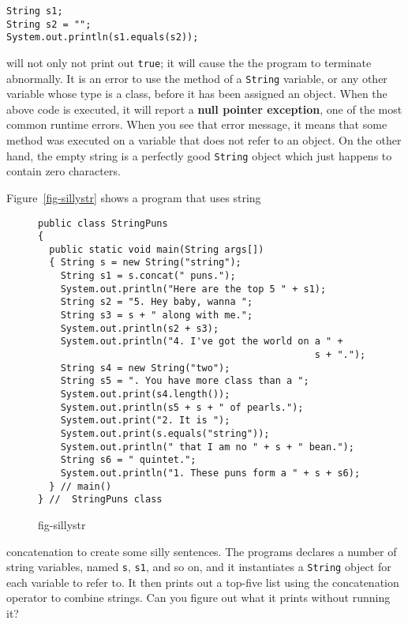 \begin{jjjlisting}
\begin{lstlisting}
String s1;
String s2 = "";
System.out.println(s1.equals(s2));
\end{lstlisting}
\end{jjjlisting}

\noindent will not only not print out {\tt true}; it will cause the
the program to terminate abnormally.  It is an error to use the
method of a {\tt String} variable, or any other variable whose type is a class,
before it has been assigned an object.  
When the above code is executed, it will report a 
{\bf null pointer exception}, one of the most common runtime errors.
When you see that error message, it means that some  method was executed 
on a variable that does not refer to an object.  On the other hand, the
empty string is a perfectly good {\tt String} object which just happens 
to contain zero characters.

Figure~\ref{fig-sillystr} shows a program that uses string
\begin{figure}[h!]
\jjjprogstart
\begin{jjjlisting}
\begin{lstlisting}
public class StringPuns 
{
  public static void main(String args[]) 
  { String s = new String("string");
    String s1 = s.concat(" puns.");
    System.out.println("Here are the top 5 " + s1);
    String s2 = "5. Hey baby, wanna ";
    String s3 = s + " along with me.";
    System.out.println(s2 + s3);
    System.out.println("4. I've got the world on a " + 
                                                 s + ".");
    String s4 = new String("two");
    String s5 = ". You have more class than a ";
    System.out.print(s4.length());
    System.out.println(s5 + s + " of pearls.");
    System.out.print("2. It is ");
    System.out.print(s.equals("string"));
    System.out.println(" that I am no " + s + " bean.");
    String s6 = " quintet.";
    System.out.println("1. These puns form a " + s + s6);        
  } // main()
} //  StringPuns class
\end{lstlisting}
\end{jjjlisting}
{fig-sillystr}
\end{figure}
concatenation to create some silly sentences.  The programs declares a
number of string variables, named {\tt s}, {\tt s1}, and so on, and
it instantiates a {\tt String} object for each variable to refer to.
It then prints out a top-five list using the concatenation operator to
combine strings. Can you figure out what it prints without running it?


